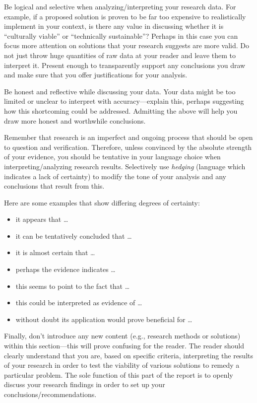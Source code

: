 \documentclass[conference]{IEEEtran}
\begin{document}
Be logical and selective when analyzing/interpreting your research data.  For example, if a proposed solution is proven to be far too expensive to realistically implement in your context, is there any value in discussing whether it is ``culturally viable'' or ``technically sustainable''? Perhaps in this case you can focus more attention on solutions that your research suggests are more valid.  Do not just throw huge quantities of raw data at your reader and leave them to interpret it. Present enough to transparently support any conclusions you draw and make sure that you offer justifications for your analysis.  

Be honest and reflective while discussing your data. Your data might be too limited or unclear to interpret with accuracy---explain this, perhaps suggesting how this shortcoming could be addressed. Admitting the above will help you draw more honest and worthwhile conclusions.  

Remember that research is an imperfect and ongoing process that should be open to question and verification. Therefore, unless convinced by the absolute strength of your evidence, you should be tentative in your language choice when interpreting/analyzing research results. Selectively use {\em hedging} (language which indicates a lack of certainty) to modify the tone of your analysis and any conclusions that result from this. 

Here are some examples that show differing degrees of certainty:
\begin{itemize}  
\item it appears that \ldots
\item it can be tentatively concluded that \ldots
\item it is almost certain that \ldots
\item perhaps the evidence indicates \ldots
\item this seems to point to the fact that \ldots
\item this could be interpreted as evidence of \ldots
\item without doubt its application would prove beneficial for \ldots
\end{itemize}

Finally, don’t introduce any new content (e.g., research methods or solutions) within this section---this will prove confusing for the reader. The reader should clearly understand that you are, based on specific criteria, interpreting the results of your research in order to test the viability of various solutions to remedy a particular problem. The sole function of this part of the report is to openly discuss your research findings in order to set up your conclusions/recommendations.
\end{document}

